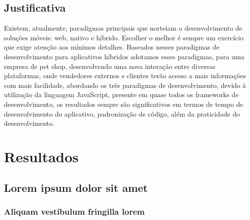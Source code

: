 \documentclass[12pt,openright,twoside,a4paper,english,french,spanish,brazil]{abntex2}
\begin{document}
\chapter*{Justificativa}
Existem, atualmente, paradigmas principais que norteiam o desenvolvimento de soluções móveis: web, nativo e híbrido. Escolher o melhor é sempre um exercício que exige atenção aos mínimos detalhes.
Baseados nesses paradigmas de desenvolvimento para aplicativos híbridos adotamos esses paradigmas, para uma empresa de pet shop, desenvolvendo uma nova interação entre diversas plataformas, onde vendedores externos e clientes terão acesso a mais informações com mais facilidade, abordando os três paradigmas de desenvolvimento, devido à utilização da linguagem JavaScript, presente em quase todos os frameworks de desenvolvimento, os resultados sempre são significativos em termos de tempo de desenvolvimento do aplicativo, padronização de código, além da praticidade do desenvolvimento.








\part{Resultados}

\chapter{Lorem ipsum dolor sit amet}

\section{Aliquam vestibulum fringilla lorem}

\lipsum[1]

\lipsum[2-3]

% 
\end{document}
